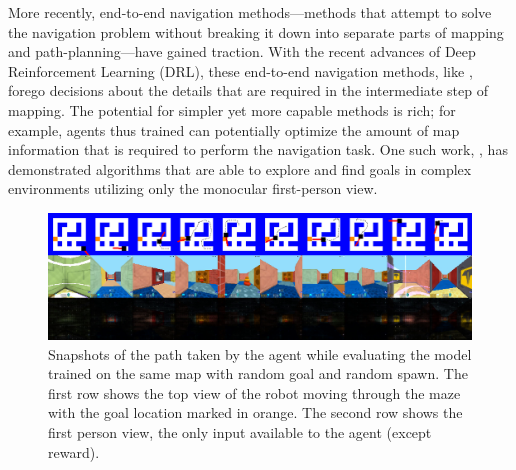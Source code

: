 More recently, end-to-end navigation methods---methods that attempt to  
solve the navigation problem without breaking it down into separate parts of mapping and path-planning---have gained traction.
%
With the recent advances of Deep Reinforcement Learning (DRL), these end-to-end navigation methods, like \cite{MnBaMiICML2016,SiHuMaNATURE2016,LePaKrISER2017,MiPaViICLR2017,OhChSiICML2016}, forego decisions about the details that are required in the intermediate step of mapping.
The potential for simpler yet more capable methods is rich; for example, agents thus trained can potentially optimize the amount of map information that is required to perform the navigation task.
One such work, \cite{MiPaViICLR2017}, has demonstrated algorithms that are able to explore and find goals in complex environments utilizing only the monocular first-person view.

\begin{figure}
\includegraphics[width=\textwidth,trim=0 336pt 0 0,clip]{./exp-results/training-09x09-0127-on-0127.png}%
\caption{
Snapshots of the path taken by the agent while evaluating the model trained on the same map with random goal and random spawn.
The first row shows the top view of the robot moving through the maze with the goal location marked in orange. The second row shows the first person view, the only input available to the agent (except reward).}
\label{fig:training-qualitative}
\end{figure}

